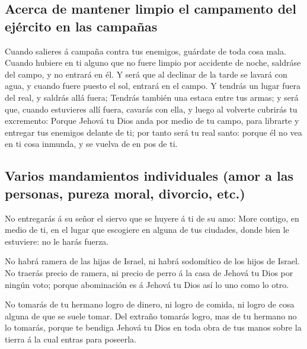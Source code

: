 \hypertarget{acerca-de-mantener-limpio-el-campamento-del-ejuxe9rcito-en-las-campauxf1as}{%
\subsection{Acerca de mantener limpio el campamento del ejército en las
campañas}\label{acerca-de-mantener-limpio-el-campamento-del-ejuxe9rcito-en-las-campauxf1as}}

 Cuando salieres á campaña contra tus enemigos, guárdate de
toda cosa mala.  Cuando hubiere en ti alguno que no fuere
limpio por accidente de noche, saldráse del campo, y no entrará en él.
 Y será que al declinar de la tarde se lavará con agua, y
cuando fuere puesto el sol, entrará en el campo.  Y tendrás
un lugar fuera del real, y saldrás allá fuera;  Tendrás
también una estaca entre tus armas; y será que, cuando estuvieres allí
fuera, cavarás con ella, y luego al volverte cubrirás tu excremento:
 Porque Jehová tu Dios anda por medio de tu campo, para
librarte y entregar tus enemigos delante de ti; por tanto será tu real
santo: porque él no vea en ti cosa inmunda, y se vuelva de en pos de ti.

\hypertarget{varios-mandamientos-individuales-amor-a-las-personas-pureza-moral-divorcio-etc.}{%
\subsection{Varios mandamientos individuales (amor a las personas,
pureza moral, divorcio,
etc.)}\label{varios-mandamientos-individuales-amor-a-las-personas-pureza-moral-divorcio-etc.}}

 No entregarás á su señor el siervo que se huyere á ti de
su amo:  More contigo, en medio de ti, en el lugar que
escogiere en alguna de tus ciudades, donde bien le estuviere: no le
harás fuerza.

 No habrá ramera de las hijas de Israel, ni habrá
sodomítico de los hijos de Israel.  No traerás precio de
ramera, ni precio de perro á la casa de Jehová tu Dios por ningún voto;
porque abominación es á Jehová tu Dios así lo uno como lo otro.

 No tomarás de tu hermano logro de dinero, ni logro de
comida, ni logro de cosa alguna de que se suele tomar.  Del
extraño tomarás logro, mas de tu hermano no lo tomarás, porque te
bendiga Jehová tu Dios en toda obra de tus manos sobre la tierra á la
cual entras para poseerla.

